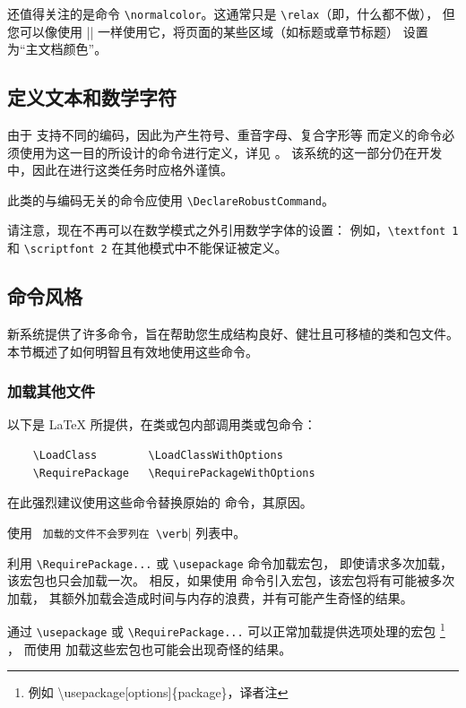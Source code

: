 \documentclass{ltxguide}[1995/11/28]
\begin{document}
还值得关注的是命令 \verb|\normalcolor|。这通常只是 \verb|\relax|（即，什么都不做），
但您可以像使用 |\normalfont| 一样使用它，将页面的某些区域（如标题或章节标题）
设置为“主文档颜色”。

\subsection{定义文本和数学字符}
\label{Sec:chars}

由于 \LaTeXe{} 支持不同的编码，因此为产生符号、重音字母、复合字形等
而定义的命令必须使用为这一目的所设计的命令进行定义，详见 \emph{\fntguide}。
该系统的这一部分仍在开发中，因此在进行这类任务时应格外谨慎。

此类的与编码无关的命令应使用 \verb|\DeclareRobustCommand|。

请注意，现在不再可以在数学模式之外引用数学字体的设置：
例如，\verb|\textfont 1| 和 \verb|\scriptfont 2|
在其他模式中不能保证被定义。

\subsection{命令风格}
\label{Sec:general}

新系统提供了许多命令，旨在帮助您生成结构良好、健壮且可移植的类和包文件。
本节概述了如何明智且有效地使用这些命令。

\subsubsection{加载其他文件}
\label{Sec:loading}

以下是 \LaTeX{} 所提供，在类或包内部调用类或包命令：
\begin{verbatim}
	\LoadClass        \LoadClassWithOptions
	\RequirePackage   \RequirePackageWithOptions
\end{verbatim}
在此强烈建议使用这些命令替换原始的 \verb|| 命令，其原因。

使用 \verb| 加载的文件不会罗列在 \verb|\listfiles| 列表中。

利用 \verb|\RequirePackage...| 或 \verb|\usepackage| 命令加载宏包，
即使请求多次加载，该宏包也只会加载一次。
相反，如果使用 \verb|| 命令引入宏包，该宏包将有可能被多次加载，
其额外加载会造成时间与内存的浪费，并有可能产生奇怪的结果。

通过 \verb|\usepackage| 或 \verb|\RequirePackage...| 可以正常加载提供选项处理的宏包
\footnote{例如 \textbackslash usepackage[options]\{package\}，译者注}
，
而使用 \verb|| 加载这些宏包也可能会出现奇怪的结果。
\end{document}
